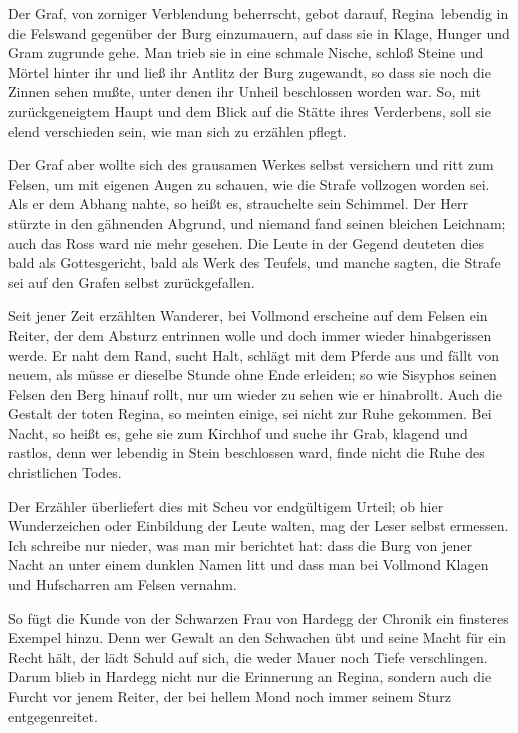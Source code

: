 Der Graf, von zorniger Verblendung beherrscht, gebot darauf, \gls{Regina}\ lebendig in die Felswand gegenüber der Burg einzumauern, auf dass sie in Klage, Hunger und Gram zugrunde gehe. Man trieb sie in eine schmale Nische, schloß Steine und Mörtel hinter ihr und ließ ihr Antlitz der Burg zugewandt, so dass sie noch die Zinnen sehen mußte, unter denen ihr Unheil beschlossen worden war. So, mit zurückgeneigtem Haupt und dem Blick auf die Stätte ihres Verderbens, soll sie elend verschieden sein, wie man sich zu erzählen pflegt.

Der Graf aber wollte sich des grausamen Werkes selbst versichern und ritt zum Felsen, um mit eigenen Augen zu schauen, wie die Strafe vollzogen worden sei. Als er dem Abhang nahte, so heißt es, strauchelte sein Schimmel. Der Herr stürzte in den gähnenden Abgrund, und niemand fand seinen bleichen Leichnam; auch das Ross ward nie mehr gesehen. Die Leute in der Gegend deuteten dies bald als Gottesgericht, bald als Werk des Teufels, und manche sagten, die Strafe sei auf den Grafen selbst zurückgefallen.

Seit jener Zeit erzählten Wanderer, bei Vollmond erscheine auf dem Felsen ein Reiter, der dem Absturz entrinnen wolle und doch immer wieder hinabgerissen werde. Er naht dem Rand, sucht Halt, schlägt mit dem Pferde aus und fällt von neuem, als müsse er dieselbe Stunde ohne Ende erleiden; so wie Sisyphos seinen Felsen den Berg hinauf rollt, nur um wieder zu sehen wie er hinabrollt. Auch die Gestalt der toten \gls{Regina}, so meinten einige, sei nicht zur Ruhe gekommen. Bei Nacht, so heißt es, gehe sie zum Kirchhof und suche ihr Grab, klagend und rastlos, denn wer lebendig in Stein beschlossen ward, finde nicht die Ruhe des christlichen Todes.

Der Erzähler überliefert dies mit Scheu vor endgültigem Urteil; ob hier Wunderzeichen oder Einbildung der Leute walten, mag der Leser selbst ermessen. Ich schreibe nur nieder, was man mir berichtet hat: dass die Burg von jener Nacht an unter einem dunklen Namen litt und dass man bei Vollmond Klagen und Hufscharren am Felsen vernahm.

So fügt die Kunde von der Schwarzen Frau von Hardegg der Chronik ein finsteres Exempel hinzu. Denn wer Gewalt an den Schwachen übt und seine Macht für ein Recht hält, der lädt Schuld auf sich, die weder Mauer noch Tiefe verschlingen. Darum blieb in Hardegg nicht nur die Erinnerung an \gls{Regina}, sondern auch die Furcht vor jenem Reiter, der bei hellem Mond noch immer seinem Sturz entgegenreitet.
